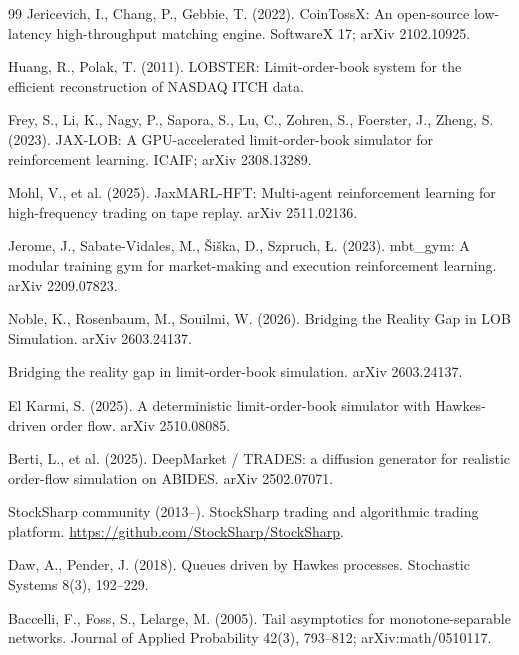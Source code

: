 \documentclass[11pt]{article}
\begin{document}
\begin{thebibliography}{99}
Jericevich, I., Chang, P., Gebbie, T. (2022).
CoinTossX: An open-source low-latency high-throughput matching engine.
SoftwareX 17; arXiv 2102.10925.

Huang, R., Polak, T. (2011).
LOBSTER: Limit-order-book system for the efficient reconstruction of NASDAQ ITCH data.

Frey, S., Li, K., Nagy, P., Sapora, S., Lu, C., Zohren, S., Foerster, J., Zheng, S. (2023).
JAX-LOB: A GPU-accelerated limit-order-book simulator for reinforcement learning.
ICAIF; arXiv 2308.13289.

Mohl, V., et al. (2025).
JaxMARL-HFT: Multi-agent reinforcement learning for high-frequency trading on tape replay.
arXiv 2511.02136.

Jerome, J., Sabate-Vidales, M., \v{S}i\v{s}ka, D., Szpruch, \L. (2023).
mbt\_gym: A modular training gym for market-making and execution reinforcement learning.
arXiv 2209.07823.

Noble, K., Rosenbaum, M., Souilmi, W. (2026).
\newblock Bridging the Reality Gap in LOB Simulation.
\newblock arXiv 2603.24137.

Bridging the reality gap in limit-order-book simulation.
arXiv 2603.24137.

El Karmi, S. (2025).
A deterministic limit-order-book simulator with Hawkes-driven order flow.
arXiv 2510.08085.

Berti, L., et al. (2025).
DeepMarket / TRADES: a diffusion generator for realistic order-flow simulation on ABIDES.
arXiv 2502.07071.

StockSharp community (2013--).
StockSharp trading and algorithmic trading platform.
\url{https://github.com/StockSharp/StockSharp}.

Daw, A., Pender, J. (2018).
Queues driven by Hawkes processes.
Stochastic Systems 8(3), 192--229.

Baccelli, F., Foss, S., Lelarge, M. (2005).
Tail asymptotics for monotone-separable networks.
Journal of Applied Probability 42(3), 793--812; arXiv:math/0510117.


\end{thebibliography}
\end{document}
